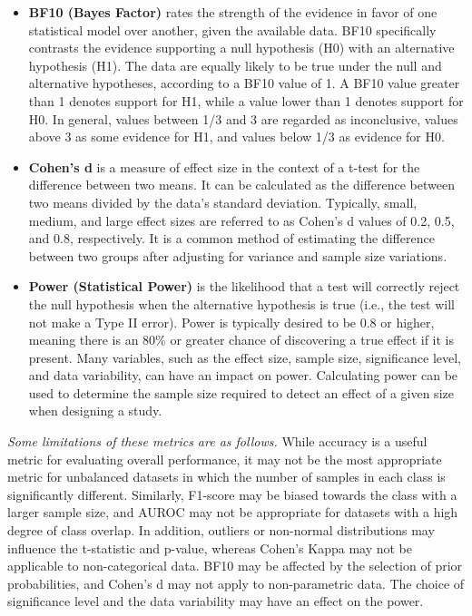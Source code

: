 \documentclass[review,1p,times,numbers]{elsarticle}
\begin{document}
\begin{itemize}
    \item \textbf{BF10 (Bayes Factor)} rates the strength of the evidence in favor of one statistical model over another, given the available data. BF10 specifically contrasts the evidence supporting a null hypothesis (H0) with an alternative hypothesis (H1). The data are equally likely to be true under the null and alternative hypotheses, according to a BF10 value of 1. A BF10 value greater than 1 denotes support for H1, while a value lower than 1 denotes support for H0. In general, values between 1/3 and 3 are regarded as inconclusive, values above 3 as some evidence for H1, and values below 1/3 as evidence for H0.
    \item \textbf{Cohen's d} is a measure of effect size in the context of a t-test for the difference between two means. It can be calculated as the difference between two means divided by the data's standard deviation. Typically, small, medium, and large effect sizes are referred to as Cohen's d values of 0.2, 0.5, and 0.8, respectively. It is a common method of estimating the difference between two groups after adjusting for variance and sample size variations.
    \item \textbf{Power (Statistical Power)} is the likelihood that a test will correctly reject the null hypothesis when the alternative hypothesis is true (i.e., the test will not make a Type II error). Power is typically desired to be 0.8 or higher, meaning there is an 80\% or greater chance of discovering a true effect if it is present. Many variables, such as the effect size, sample size, significance level, and data variability, can have an impact on power. Calculating power can be used to determine the sample size required to detect an effect of a given size when designing a study.
\end{itemize}

\textit{Some limitations of these metrics are as follows.}
While accuracy is a useful metric for evaluating overall performance, it may not be the most appropriate metric for unbalanced datasets in which the number of samples in each class is significantly different. Similarly, F1-score may be biased towards the class with a larger sample size, and AUROC may not be appropriate for datasets with a high degree of class overlap. In addition, outliers or non-normal distributions may influence the t-statistic and p-value, whereas Cohen's Kappa may not be applicable to non-categorical data. BF10 may be affected by the selection of prior probabilities, and Cohen's d may not apply to non-parametric data. The choice of significance level and the data variability may have an effect on the power.
\end{document}
